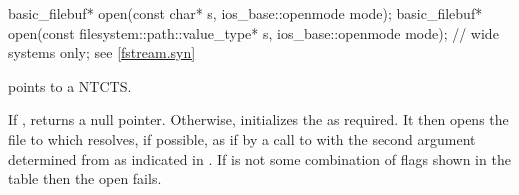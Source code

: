 %
\begin{itemdecl}
basic_filebuf* open(const char* s, ios_base::openmode mode);
basic_filebuf* open(const filesystem::path::value_type* s,
                    ios_base::openmode mode);  // wide systems only; see \ref{fstream.syn}
\end{itemdecl}

\begin{itemdescr}
\pnum
\expects
{} points to a NTCTS.

\pnum
\effects
If
,
returns a null pointer.
Otherwise,
initializes the
as required.
It then opens
the file to which  resolves, if possible,
as if by a call to 
%
with the second argument determined from
as indicated in .
If  is not some combination of flags shown in the table then
the open fails.


\end{itemdescr}
